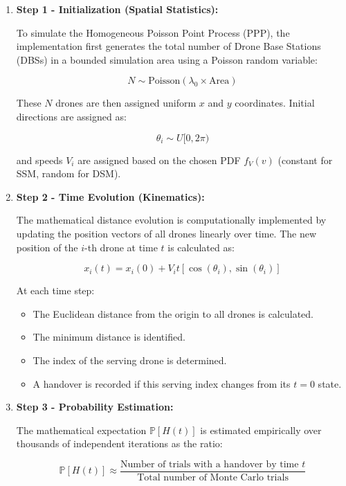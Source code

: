 \documentclass[12pt,a4paper]{article}
\begin{document}
\begin{enumerate}
    \item \textbf{Step 1 - Initialization (Spatial Statistics):}

    To simulate the Homogeneous Poisson Point Process (PPP), the implementation first generates the total number of Drone Base Stations (DBSs) in a bounded simulation area using a Poisson random variable:
    
    \[
    N \sim \text{Poisson}(\lambda_0 \times \text{Area})
    \]

    These $N$ drones are then assigned uniform $x$ and $y$ coordinates. Initial directions are assigned as:
    
    \[
    \theta_i \sim U[0, 2\pi)
    \]

    and speeds $V_i$ are assigned based on the chosen PDF $f_V(v)$ (constant for SSM, random for DSM).



    \item \textbf{Step 2 - Time Evolution (Kinematics):}

    The mathematical distance evolution is computationally implemented by updating the position vectors of all drones linearly over time. The new position of the $i$-th drone at time $t$ is calculated as:

    \[
    x_i(t) = x_i(0) + V_i t [\cos(\theta_i), \sin(\theta_i)]
    \]

    At each time step:
    \begin{itemize}
        \item The Euclidean distance from the origin to all drones is calculated.
        \item The minimum distance is identified.
        \item The index of the serving drone is determined.
        \item A handover is recorded if this serving index changes from its $t=0$ state.
    \end{itemize}

    \item \textbf{Step 3 - Probability Estimation:}

    The mathematical expectation $\mathbb{P}[H(t)]$ is estimated empirically over thousands of independent iterations as the ratio:

    \[
    \mathbb{P}[H(t)] \approx 
    \frac{\text{Number of trials with a handover by time } t}
    {\text{Total number of Monte Carlo trials}}
    \]
\end{enumerate}
\end{document}
